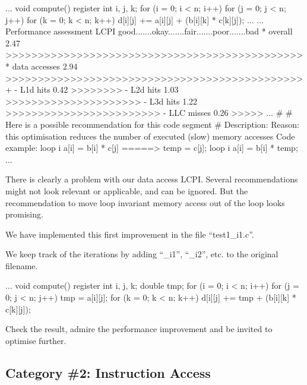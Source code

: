 \begin{prompt}
...
void compute()
{
register int i, j, k;
for (i = 0; i < n; i++)
  for (j = 0; j < n; j++)
    for (k = 0; k < n; k++)
      d[i][j] += a[i][j] + (b[i][k] * c[k][j]);
}
...
...
Performance assessment  LCPI good.......okay.......fair.......poor.......bad
* overall              2.47 >>>>>>>>>>>>>>>>>>>>>>>>>>>>>>>>>>>>>>>>>>>>>>
* data accesses        2.94 >>>>>>>>>>>>>>>>>>>>>>>>>>>>>>>>>>>>>>>>>>>>>>+
- L1d hits             0.42 >>>>>>>>
- L2d hits             1.03 >>>>>>>>>>>>>>>>>>>>>
- L3d hits             1.22 >>>>>>>>>>>>>>>>>>>>>>>>
- LLC misses           0.26 >>>>>
...
\#
\# Here is a possible recommendation for this code segment
\#
Description: %
Reason: this optimisation reduces the number of executed (slow) memory accesses
Code example:
loop i {
  a[i] = b[i] * c[j]
}
=====>
temp = c[j];
loop i {
 a[i] = b[i] * temp;
}
...
\end{prompt}

There is clearly a problem with our data access LCPI. Several recommendations might not look relevant or applicable, and can be ignored. But the recommendation to move loop invariant memory access out of the loop looks promising.

We have implemented this first improvement in the file ``test1\_i1.c''.

 We keep track of the iterations by adding ``\_i1'', ``\_i2'', etc. to the original filename.

\begin{prompt}
...
void compute()
{
register int i, j, k;
double tmp;
for (i = 0; i < n; i++)
  for (j = 0; j < n; j++)
  {
    tmp = a[i][j];
    for (k = 0; k < n; k++)
      d[i][j] += tmp + (b[i][k] * c[k][j]);
  }
}
\end{prompt}

Check the result, admire the performance improvement and be invited to optimise further.

\subsection{Category \#2: Instruction Access}
\label{ch03:subsec:CAT2_Instruction_Access}

